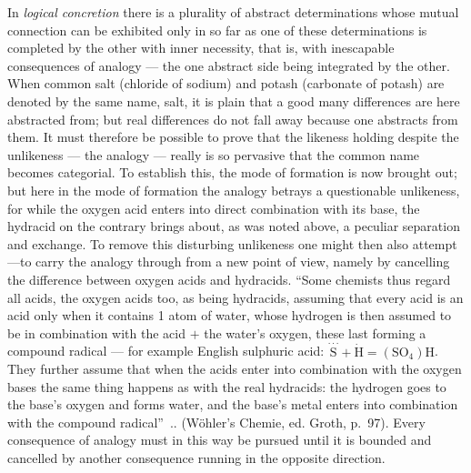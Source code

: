 \documentclass[12pt,a4paper]{book}
\begin{document}
In \emph{logical concretion} there is a plurality of abstract determinations
whose mutual connection can be exhibited only in so far as one of these
determinations is completed by the other with inner necessity, that is, with
inescapable consequences of analogy --- the one abstract side being integrated
by the other. When common salt
(chloride of sodium) and potash (carbonate of potash) are denoted by the same
name, salt, it is plain that a good many differences are here abstracted from;
but real differences do not fall away because one abstracts from them. It must
therefore be possible to prove that the likeness holding despite the unlikeness
--- the analogy --- really is so pervasive that the common name becomes
categorial. To establish this, the mode of formation is now brought out; but
here in the mode of formation the analogy betrays a questionable unlikeness,
for while the oxygen acid enters into direct combination with its base, the
hydracid on the contrary brings about, as was noted above, a peculiar
separation and exchange. To remove this disturbing unlikeness one might then
also
attempt---to carry the analogy through from a new point of view, namely by
cancelling the difference between oxygen acids and hydracids. ``Some chemists
thus regard all acids, the oxygen acids too, as being hydracids, assuming that
every acid is an acid only when it contains 1 atom of water, whose hydrogen is
then assumed to be in combination with the acid $+$ the water's oxygen, these
last forming a compound radical --- for example English sulphuric acid:
$\stackrel{\cdot\cdot\cdot}{\mathrm{S}} + \dot{\mathrm{H}} =
(\mathrm{SO}_4)\mathrm{H}$.
They further assume that when the acids enter into combination with the oxygen
bases the same thing happens as with the real hydracids: the hydrogen goes to
the base's oxygen and forms water, and the base's metal enters into combination
with the
compound radical''\ .. (Wöhler's Chemie, ed. Groth, p.~97). Every consequence
of analogy must in this way be pursued until it is bounded and cancelled by
another consequence running in the opposite direction.
\end{document}
